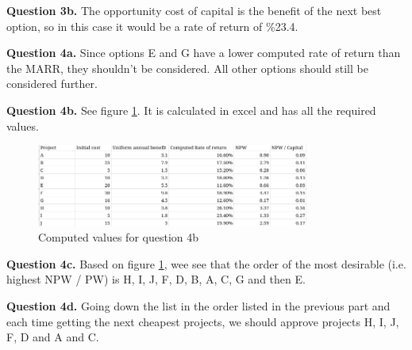 \documentclass[letterpaper, reqno,11pt]{article}
\begin{document}
{\noindent\bf Question 3b.} The opportunity cost of capital is the benefit of the next best option, so in this case it would be a rate of return of \%23.4. 

{\noindent\bf Question 4a.} Since options E and G have a lower computed rate of return than the MARR, they shouldn't be considered. All other options should still be considered further. 

{\noindent\bf Question 4b.} See figure \ref{fig:q4}. It is calculated in excel and has all the required values. 

\begin{figure}[htpb]
    \centering
    \includegraphics[width=0.8\textwidth]{q4}
    \caption{Computed values for question 4b}
    \label{fig:q4}
\end{figure}

{\noindent\bf Question 4c.} Based on figure \ref{fig:q4}, wee see that the order of the most desirable (i.e. highest NPW / PW) is H, I, J, F, D, B, A, C, G and then E. 

{\noindent\bf Question 4d.} Going down the list in the order listed in the previous part and each time getting the next cheapest projects, we should approve projects H, I, J, F, D and A and C. 
\end{document}
